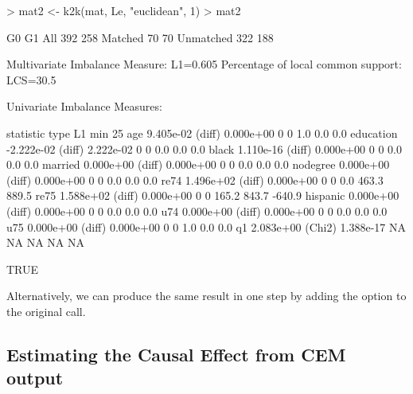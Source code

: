 \documentclass[article]{jss}
\begin{document}
\begin{Schunk}
\begin{Sinput}
> mat2 <- k2k(mat, Le, "euclidean", 1)
> mat2
\end{Sinput}
\begin{Soutput}
           G0  G1
All       392 258
Matched    70  70
Unmatched 322 188


Multivariate Imbalance Measure: L1=0.605
Percentage of local common support: LCS=30.5%

Univariate Imbalance Measures:

           statistic   type        L1 min 25%
age        9.405e-02 (diff) 0.000e+00   0   0   1.0   0.0    0.0
education -2.222e-02 (diff) 2.222e-02   0   0   0.0   0.0    0.0
black      1.110e-16 (diff) 0.000e+00   0   0   0.0   0.0    0.0
married    0.000e+00 (diff) 0.000e+00   0   0   0.0   0.0    0.0
nodegree   0.000e+00 (diff) 0.000e+00   0   0   0.0   0.0    0.0
re74       1.496e+02 (diff) 0.000e+00   0   0   0.0 463.3  889.5
re75       1.588e+02 (diff) 0.000e+00   0   0 165.2 843.7 -640.9
hispanic   0.000e+00 (diff) 0.000e+00   0   0   0.0   0.0    0.0
u74        0.000e+00 (diff) 0.000e+00   0   0   0.0   0.0    0.0
u75        0.000e+00 (diff) 0.000e+00   0   0   1.0   0.0    0.0
q1         2.083e+00 (Chi2) 1.388e-17  NA  NA    NA    NA     NA
\end{Soutput}
\begin{Soutput}
[1] TRUE
\end{Soutput}
\end{Schunk}
Alternatively, we can produce the same result in one step by adding
the  option to the original  call.

\subsection{Estimating the Causal Effect from CEM output}
\end{document}
